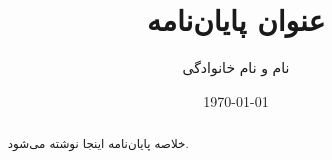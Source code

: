 \documentclass[12pt]{report}
\begin{document}
\title{عنوان پایان‌نامه}
\author{نام و نام خانوادگی}
\date{\today}
\maketitle

\begin{abstract}
خلاصه پایان‌نامه اینجا نوشته می‌شود.
\end{abstract}

\tableofcontents        %
\listoffigures          %
\listoftables           %





\nocite{*}               %
\printbibliography
\end{document}

